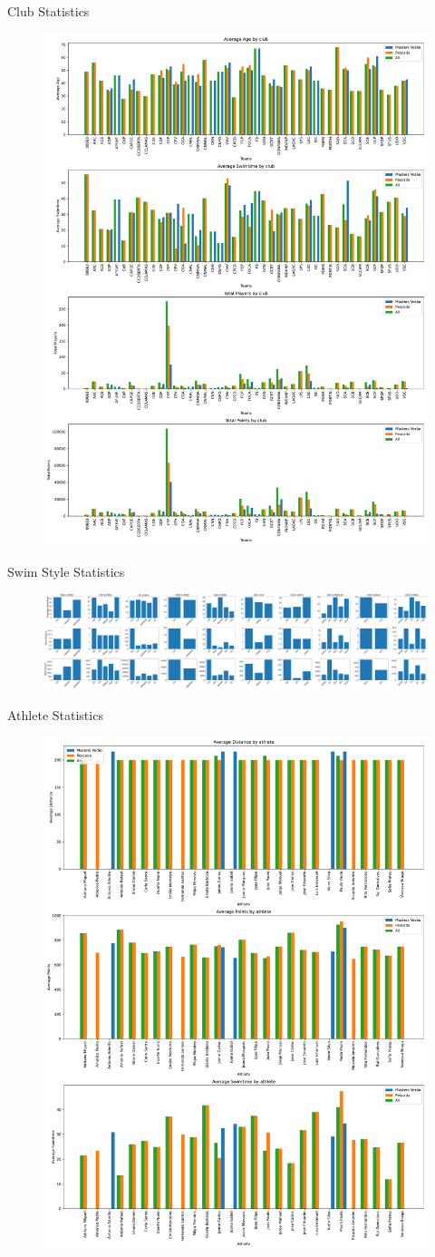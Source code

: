 \documentclass[aspectratio=169, xcolor=dvipsnames]{beamer}
\begin{document}
\begin{frame}{Club Statistics}
\begin{figure}
    \centering
    \includegraphics[width=.4\textwidth]{img/club_fact1.pdf}
\end{figure}
\end{frame}

\begin{frame}{Swim Style Statistics}
\begin{figure}
    \centering
    \includegraphics[width=\textwidth]{img/stats_clubs_swim.pdf}
\end{figure}
\end{frame}

\begin{frame}{Athlete Statistics}
\begin{figure}
    \centering
    \includegraphics[width=.4\textwidth]{img/athletefact.pdf}
\end{figure}
\end{frame}
\end{document}
